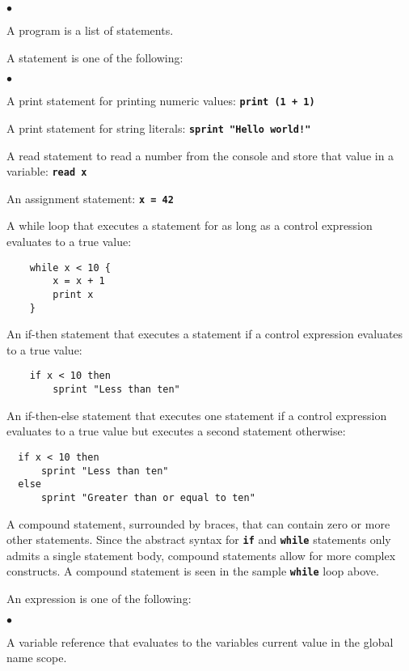 \documentclass[12pt]{article}
\newcommand\code[1]{\texttt{\textbf{#1}}}
\newenvironment{notelist}{\begin{list}
   {$\bullet$}
   {\setlength{\itemsep}{0in}}}
   {\end{list}}
\begin{document}
\begin{notelist}
    \item A program is a list of statements.
    \item A statement is one of the following:
        \begin{notelist}
            \item A print statement for printing numeric values: \code{print (1 + 1)}
            \item A print statement for string literals: \code{sprint "Hello world!"}
            \item A read statement to read a number from the console and store that value in a variable: \code{read x}
            \item An assignment statement: \code{x = 42}
            \item A while loop that executes a statement for as long as a control expression evaluates to a true value:
\begin{lstlisting}
    while x < 10 {
        x = x + 1
        print x
    }
\end{lstlisting}
            \item An if-then statement that executes a statement if a control expression evaluates to a true value:
\begin{lstlisting}
    if x < 10 then
        sprint "Less than ten"
\end{lstlisting}
            \item An if-then-else statement that executes one statement if a control expression evaluates to a true value but
                  executes a second statement otherwise:
\begin{lstlisting}
  if x < 10 then
      sprint "Less than ten"
  else
      sprint "Greater than or equal to ten"
\end{lstlisting}
            \item A compound statement, surrounded by braces, that can contain zero or more other statements. Since the abstract syntax
                  for \code{if} and \code{while} statements only admits a single statement body, compound statements allow for more
                  complex constructs. A compound statement is seen in the sample \code{while} loop above.
        \end{notelist}
    \item An expression is one of the following:
        \begin{notelist}
            \item A variable reference that evaluates to the variables current value in the global name scope.

\end{notelist}
\end{notelist}
\end{document}
